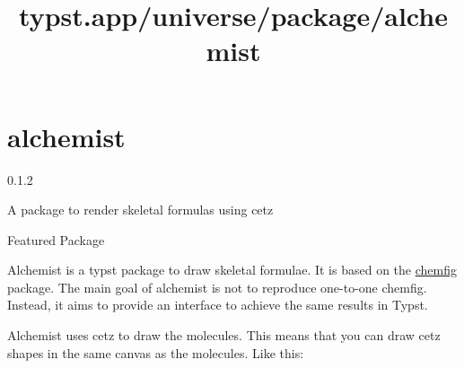 \title{typst.app/universe/package/alchemist}

\label{banner}
\section{alchemist}\label{alchemist}

{ 0.1.2 }

A package to render skeletal formulas using cetz

{ } Featured Package

\label{readme}
Alchemist is a typst package to draw skeletal formulae. It is based on
the \href{https://ctan.org/pkg/chemfig}{chemfig} package. The main goal
of alchemist is not to reproduce one-to-one chemfig. Instead, it aims to
provide an interface to achieve the same results in Typst.

\begin{Shaded}
\begin{Highlighting}[]
\NormalTok{      ),}
\NormalTok{    )}
\NormalTok{  \})}
\NormalTok{      ),}
\NormalTok{    )}
\NormalTok{  \})}
\NormalTok{    ),}
\NormalTok{  )}
\NormalTok{\})}
\end{Highlighting}
\end{Shaded}


Alchemist uses cetz to draw the molecules. This means that you can draw
cetz shapes in the same canvas as the molecules. Like this:

